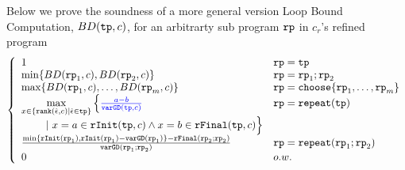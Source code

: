 Below we prove the soundness of a more general version Loop Bound Computation, $BD(\mathtt{tp}, c)$, for an arbitrarty sub program $\mathtt{rp}$ in $c_r$'s refined program
\[
  \left\{
  \begin{array}{lll}
    1 &  \rprog = \tpath\\
    \min \left\{BD(\rprog_1, c), BD(\rprog_2, c) \right\} & \rprog = \rprog_1;\rprog_2\\
    \max\left\{ BD(\rprog_1, c), \ldots, BD(\rprog_m, c) \right\} & \rprog = \rpchoose{\rprog_1, \ldots, \rprog_m } \\
    \max\limits_{x \in \left\{ \locbound(\absevent, c) | \absevent \in \tpath \right\}}
    \Big\{ \highlight{\frac{a - b}{\varGD(\tpath, c)}}  &  \rprog = \rprepeat(\tpath)
    \\ \qquad 
    ~\vert~
    x = a \in \rfinit(\tpath, c)
    \land x = b \in \rffinal(\tpath, c)
    \Big\} 
    \\
    \frac{\min\{ \rfinit(\rprog_1), \rfinit(\rprog_1) - \varGD(\rprog_1) \} - \rffinal(\rprog_2;\rprog_2)}{ 
    \varGD(\rprog_1;\rprog_2)}  & \rprog = \rprepeat(\rprog_1;\rprog_2)
    \\
    0  &  o.w.
\end{array}
\right.
\]
 
